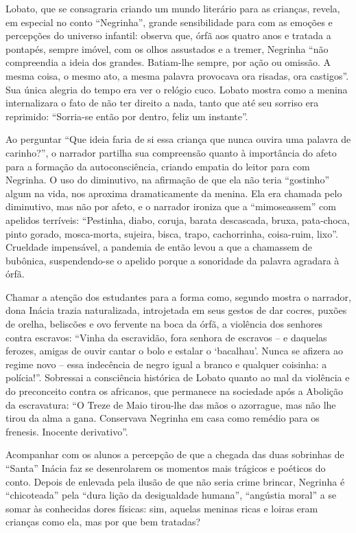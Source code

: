 \documentclass[11pt]{extarticle}
\begin{document}
Lobato, que se consagraria criando um mundo literário para as crianças,
revela, em especial no conto ``Negrinha'', grande sensibilidade para com
as emoções e percepções do universo infantil: observa que, órfã aos
quatro anos e tratada a pontapés, sempre imóvel, com os olhos assustados
e a tremer, Negrinha ``não compreendia a ideia dos grandes. Batiam-lhe
sempre, por ação ou omissão. A mesma coisa, o mesmo ato, a mesma palavra
provocava ora risadas, ora castigos''. Sua única alegria do tempo era
ver o relógio cuco. Lobato mostra como a menina internalizara o fato de
não ter direito a nada, tanto que até seu sorriso era reprimido:
``Sorria-se então por dentro, feliz um instante''.

Ao perguntar ``Que ideia faria de si essa criança que nunca ouvira uma
palavra de carinho?'', o narrador partilha sua compreensão quanto à
importância do afeto para a formação da autoconsciência, criando empatia
do leitor para com Negrinha. O uso do diminutivo, na afirmação de que
ela não teria ``gostinho'' algum na vida, nos aproxima dramaticamente da
menina. Ela era chamada pelo diminutivo, mas não por afeto, e o narrador
ironiza que a ``mimoseassem'' com apelidos terríveis: ``Pestinha, diabo,
coruja, barata descascada, bruxa, pata-choca, pinto gorado, mosca-morta,
sujeira, bisca, trapo, cachorrinha, coisa-ruim, lixo''. Crueldade
impensável, a pandemia de então levou a que a chamassem de bubônica,
suspendendo-se o apelido porque a sonoridade da palavra agradara à órfã.

Chamar a atenção dos estudantes para a forma como, segundo mostra o
narrador, dona Inácia trazia naturalizada, introjetada em seus gestos de
dar cocres, puxões de orelha, beliscões e ovo fervente na boca da órfã,
a violência dos senhores contra escravos: ``Vinha da escravidão, fora
senhora de escravos -- e daquelas ferozes, amigas de ouvir cantar o bolo
e estalar o `bacalhau'. Nunca se afizera ao regime novo -- essa
indecência de negro igual a branco e qualquer coisinha: a polícia!''.
Sobressai a consciência histórica de Lobato quanto ao mal da violência e
do preconceito contra os africanos, que permanece na sociedade após a
Abolição da escravatura: ``O Treze de Maio tirou-lhe das mãos o
azorrague, mas não lhe tirou da alma a gana. Conservava Negrinha em casa
como remédio para os frenesis. Inocente derivativo''.

Acompanhar com os alunos a percepção de que a chegada das duas sobrinhas
de ``Santa'' Inácia faz se desenrolarem os momentos mais trágicos e
poéticos do conto. Depois de enlevada pela ilusão de que não seria crime
brincar, Negrinha é ``chicoteada'' pela ``dura lição da desigualdade
humana'', ``angústia moral'' a se somar às conhecidas dores físicas:
sim, aquelas meninas ricas e loiras eram crianças como ela, mas por que
bem tratadas?
\end{document}
